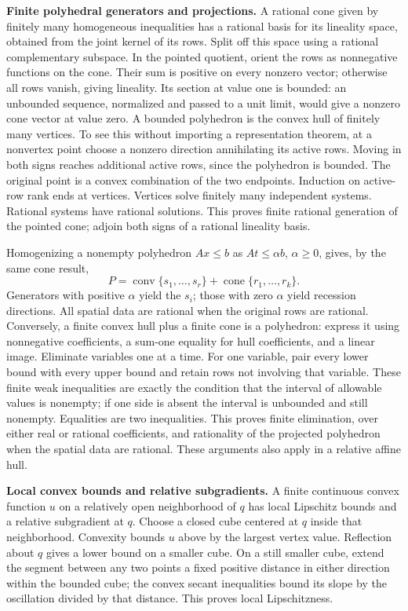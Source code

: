 \documentclass[
  11pt,
]{article}
\begin{document}
\textbf{Finite polyhedral generators and projections.} A rational cone
given by finitely many homogeneous inequalities has a rational basis for
its lineality space, obtained from the joint kernel of its rows. Split
off this space using a rational complementary subspace. In the pointed
quotient, orient the rows as nonnegative functions on the cone. Their
sum is positive on every nonzero vector; otherwise all rows vanish,
giving lineality. Its section at value one is bounded: an unbounded
sequence, normalized and passed to a unit limit, would give a nonzero
cone vector at value zero. A bounded polyhedron is the convex hull of
finitely many vertices. To see this without importing a representation
theorem, at a nonvertex point choose a nonzero direction annihilating
its active rows. Moving in both signs reaches additional active rows,
since the polyhedron is bounded. The original point is a convex
combination of the two endpoints. Induction on active-row rank ends at
vertices. Vertices solve finitely many independent systems. Rational
systems have rational solutions. This proves finite rational generation
of the pointed cone; adjoin both signs of a rational lineality basis.

Homogenizing a nonempty polyhedron \(A x\leq b\) as \(A t\leq\alpha b\),
\(\alpha\geq0\), gives, by the same cone result,
\[ P=\operatorname{conv}\{s_1,\ldots,s_r\}+\operatorname{cone}\{r_1,\ldots,r_k\}. \]
Generators with positive \(\alpha\) yield the \(s_i\); those with zero
\(\alpha\) yield recession directions. All spatial data are rational
when the original rows are rational. Conversely, a finite convex hull
plus a finite cone is a polyhedron: express it using nonnegative
coefficients, a sum-one equality for hull coefficients, and a linear
image. Eliminate variables one at a time. For one variable, pair every
lower bound with every upper bound and retain rows not involving that
variable. These finite weak inequalities are exactly the condition that
the interval of allowable values is nonempty; if one side is absent the
interval is unbounded and still nonempty. Equalities are two
inequalities. This proves finite elimination, over either real or
rational coefficients, and rationality of the projected polyhedron when
the spatial data are rational. These arguments also apply in a relative
affine hull.

\textbf{Local convex bounds and relative subgradients.} A finite
continuous convex function \(u\) on a relatively open neighborhood of
\(q\) has local Lipschitz bounds and a relative subgradient at \(q\).
Choose a closed cube centered at \(q\) inside that neighborhood.
Convexity bounds \(u\) above by the largest vertex value. Reflection
about \(q\) gives a lower bound on a smaller cube. On a still smaller
cube, extend the segment between any two points a fixed positive
distance in either direction within the bounded cube; the convex secant
inequalities bound its slope by the oscillation divided by that
distance. This proves local Lipschitzness.
\end{document}

